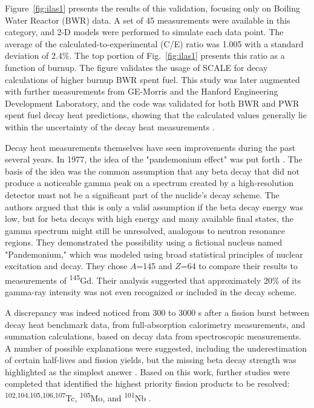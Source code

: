 \documentclass{anstrans}
\begin{document}
Figure~\ref{fig:ilas1} presents the results of this validation, focusing only on Boiling Water Reactor (BWR) data. A set of 45 measurements were available in this category, and 2-D models were performed to simulate each data point. The average of the calculated-to-experimental (C/E) ratio was 1.005 with a standard deviation of 2.4\%. The top portion of Fig.~\ref{fig:ilas1} presents this ratio as a function of burnup. The figure validates the usage of SCALE for decay calculations of higher burnup BWR spent fuel. This study was later augmented with further measurements from GE-Morris and the Hanford Engineering Development Laboratory, and the code was validated for both BWR and PWR spent fuel decay heat predictions, showing that the calculated values generally lie within the uncertainty of the decay heat measurements \cite{Gaul2010}.

Decay heat measurements themselves have seen improvements during the past several years. In 1977, the idea of the "pandemonium effect" was put forth \cite{Hard1977}. The basis of the idea was the common assumption that any beta decay that did not produce a noticeable gamma peak on a spectrum created by a high-resolution detector must not be a significant part of the nuclide's decay scheme. The authors argued that this is only a valid assumption if the beta decay energy was low, but for beta decays with high energy and many available final states, the gamma spectrum might still be unresolved, analogous to neutron resonance regions. They demonstrated the possibility using a fictional nucleus named "Pandemonium," which was modeled using broad statistical principles of nuclear excitation and decay. They chose $A$=145 and $Z$=64 to compare their results to measurements of \textsuperscript{145}Gd. Their analysis suggested that approximately 20\% of its gamma-ray intensity was not even recognized or included in the decay scheme.

A discrepancy was indeed noticed from 300 to 3000 s after a fission burst between decay heat benchmark data, from full-absorption calorimetry measurements, and summation calculations, based on decay data from spectroscopic measurements.  A number of possible explanations were suggested, including the underestimation of certain half-lives and fission yields, but the missing beta decay strength was highlighted as the simplest answer \cite{Yosh1999}. Based on this work, further studies were completed that identified the highest priority fission products to be resolved: \textsuperscript{102,104,105,106,107}Tc, \textsuperscript{105}Mo, and \textsuperscript{101}Nb \cite{Algo2014}.
\end{document}
